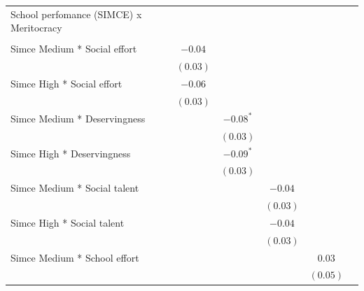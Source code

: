 \documentclass[
  12pt,
  letterpaper,
]{article}
\begin{document}
\begin{table}
{\begin{center}
{\begin{threeparttable}
\begin{tabular}{l c c c c c}
School perfomance (SIMCE) x Meritocracy   &               &               &               &               &               \\
                                          &               &               &               &               &               \\
\quad Simce Medium * Social effort        & $-0.04$       &               &               &               &               \\
                                          & $(0.03)$      &               &               &               &               \\
\quad Simce High * Social effort          & $-0.06$       &               &               &               &               \\
                                          & $(0.03)$      &               &               &               &               \\
\quad Simce Medium * Deservingness        &               & $-0.08^{*}$   &               &               &               \\
                                          &               & $(0.03)$      &               &               &               \\
\quad Simce High * Deservingness          &               & $-0.09^{*}$   &               &               &               \\
                                          &               & $(0.03)$      &               &               &               \\
\quad Simce Medium * Social talent        &               &               & $-0.04$       &               &               \\
                                          &               &               & $(0.03)$      &               &               \\
\quad Simce High * Social talent          &               &               & $-0.04$       &               &               \\
                                          &               &               & $(0.03)$      &               &               \\
\quad Simce Medium * School effort        &               &               &               & $0.03$        &               \\
                                          &               &               &               & $(0.05)$      &               \\

\end{tabular}
\end{threeparttable}}
\end{center}}
\end{table}
\end{document}
